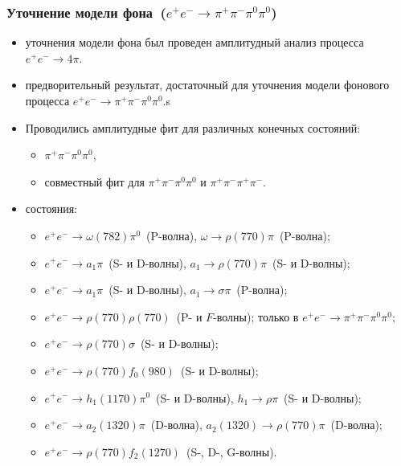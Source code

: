 \documentclass{beamer}
\begin{document}
\begin{frame}
  \frametitle{Уточнение модели фона~($e^+e^-\to\pi^+\pi^-\pi^0\pi^0$)}
  \begin{itemize}
    \item{ уточнения модели фона был проведен амплитудный анализ процесса
        $e^+e^-\to{4\pi}$. }
      \item{ предворительный результат, достаточный для уточнения
      модели фонового процесса $e^+e^-\to\pi^+\pi^-\pi^0\pi^0$.s}
    \item{\scriptsize Проводились амплитудные фит для различных конечных состояний:}
      \begin{itemize}
      \item{\scriptsize $\pi^+\pi^-\pi^0\pi^0$,}
      \item{\scriptsize совместный фит для $\pi^+\pi^-\pi^0\pi^0$ и $\pi^+\pi^-\pi^+\pi^-$.}
      \end{itemize}
    \item{ состояния:}
      \begin{itemize}
      \item{\scriptsize$e^+e^-\to\omega(782)\pi^0$~(P-волна), $\omega\to\rho(770)\pi$~(P-волна); %
        }
        \item{\scriptsize$e^+e^-\to{a}_1\pi$~(S- и D-волны), ${a}_1\to\rho(770)\pi$~(S- и D-волны);}
        \item{\scriptsize$e^+e^-\to{a}_1\pi$~(S- и D-волны), ${a}_1\to\sigma\pi$~(P-волна);}
        \item{\scriptsize$e^+e^-\to\rho(770)\rho(770)$~(P- и $F$-волны); только в $e^+e^-\to\pi^+\pi^-\pi^0\pi^0$;}
        \item{\scriptsize$e^+e^-\to\rho(770)\sigma$~(S- и D-волны);}
      \item{\scriptsize$e^+e^-\to\rho(770)f_0(980)$~(S- и D-волны);}
      \item{\scriptsize$e^+e^-\to{h}_1(1170)\pi^0$~(S- и D-волны), ${h}_1\to\rho\pi$~(S- и
          D-волны); %
        }
      \item{\scriptsize$e^+e^-\to{a}_2(1320)\pi$~(D-волна), ${a}_2(1320)\to\rho(770)\pi$~(D-волна);}
      \item{\scriptsize$e^+e^-\to\rho(770)f_2(1270)$~(S-, D-, G-волны).}
      \end{itemize}
  \end{itemize}
\end{frame}
\end{document}
